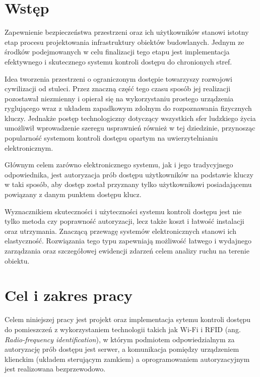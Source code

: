 \label{chap:intro}

	\section{Wstęp}
		Zapewnienie bezpieczeństwa przestrzeni oraz ich użytkowników stanowi istotny etap procesu projektowania infrastruktury obiektów budowlanych. Jednym ze środków podejmowanych w celu finalizacji tego etapu jest implementacja efektywnego i skutecznego systemu kontroli dostępu do chronionych stref.

		Idea tworzenia przestrzeni o ograniczonym dostępie towarzyszy rozwojowi cywilizacji od stuleci. Przez znaczną część tego czasu sposób jej realizacji pozostawał niezmienny i opierał się na wykorzystaniu prostego urządzenia ryglującego wraz z układem zapadkowym zdolnym do rozpoznawania fizycznych kluczy. Jednakże postęp technologiczny dotyczący wszystkich sfer ludzkiego życia umożliwił wprowadzenie szeregu usprawnień również w tej dziedzinie, przynosząc popularność systemom kontroli dostępu opartym na uwierzytelnianiu elektronicznym.

		Głównym celem zarówno elektronicznego systemu, jak i jego tradycyjnego odpowiednika, jest autoryzacja prób dostępu użytkowników na podstawie kluczy w taki sposób, aby dostęp został przyznany tylko użytkownikowi posiadającemu powiązany z danym punktem dostępu klucz.

		Wyznacznikiem skuteczności i użyteczności systemu kontroli dostępu jest nie tylko metoda czy poprawność autoryzacji, lecz także koszt i łatwość instalacji oraz utrzymania. Znaczącą przewagę systemów elektronicznych stanowi ich elastyczność. Rozwiązania tego typu zapewniają możliwość łatwego i wydajnego zarządzania oraz szczegółowej ewidencji zdarzeń celem analizy ruchu na terenie obiektu.

	\section{Cel i zakres pracy}

		Celem niniejszej pracy jest projekt oraz implementacja sytemu kontroli dostępu do pomieszczeń z wykorzystaniem technologii takich jak Wi-Fi i RFID (ang. \textit{Radio-frequency identification}), w którym podmiotem odpowiedzialnym za autoryzację prób dostępu jest serwer, a komunikacja pomiędzy urządzeniem klienckim (układem sterującym zamkiem) a oprogramowaniem autoryzacyjnym jest realizowana bezprzewodowo.

